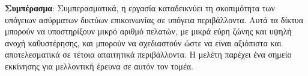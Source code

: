 \documentclass[12pt]{article}
\begin{document}
\begin{multicols}{2}
    \textbf{Συμπέρασμα}: Συμπερασματικά, η εργασία καταδεικνύει τη σκοπιμότητα των υπόγειων ασύρματων δικτύων επικοινωνίας σε υπόγεια περιβάλλοντα. Αυτά τα δίκτυα μπορούν να υποστηρίξουν μικρό αριθμό πελατών, με μικρά εύρη ζώνης και υψηλή ανοχή καθυστέρησης, και μπορούν να σχεδιαστούν ώστε να είναι αξιόπιστα και αποτελεσματικά σε τέτοια απαιτητικά περιβάλλοντα. Η μελέτη παρέχει ένα σημείο εκκίνησης για μελλοντική έρευνα σε αυτόν τον τομέα.
\end{multicols}
\end{document}
